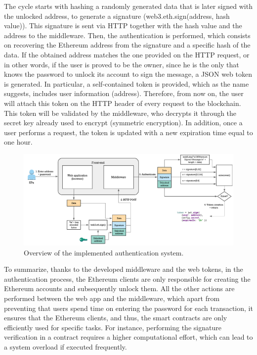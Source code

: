 The cycle starts with hashing a randomly generated data that is later signed with the unlocked address, to generate a signature (web3.eth.sign(address, hash value)). This signature is sent via HTTP together with the hash value and the address to the middleware. Then, the authentication is performed, which consists on recovering the  Ethereum address from the signature and a specific hash of the data. If the obtained address matches the one provided on the HTTP request, or in other words, if the user is proved to be the owner, since he is the only that knows the password to unlock its account to sign the message, a JSON web token is generated. In particular, a self-contained token is provided, which as the name suggests, includes user information (address). Therefore, from now on, the user will attach this token on the HTTP header of every request to the blockchain. This token will be validated by the middleware, who decrypts it through the secret key already used to encrypt (symmetric encryption). In addition, once a user performs a request, the token is updated with a new expiration time equal to one hour.

\begin{figure}[bth]
	\centering
	\includegraphics[width=1\linewidth]{gfx/Authentication_implementation}    
  	\caption{Overview of the implemented authentication system.}
  	\label{fig:authImplem}
\end{figure}

To summarize, thanks to the developed middleware and the web tokens, in the authentication process, the Ethereum clients are only responsible for creating the Ethereum accounts and subsequently unlock them. All the other actions are performed between the web app and the middleware, which apart from preventing that users spend time on entering the password for each transaction, it ensures that the Ethereum clients, and thus, the smart contracts are only efficiently used for specific tasks. For instance, performing the signature verification in a contract requires a higher computational effort, which can lead to a system overload if executed frequently.


